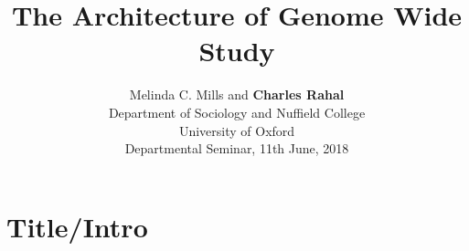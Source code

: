 \documentclass[11pt]{beamer}
\begin{document}
\section{Title/Intro}
\subsection{}
\small
\title{The Architecture of Genome Wide Study\vspace{-.2in}} 
\author{Melinda C. Mills and \textbf{Charles Rahal}\\ Department of Sociology and Nuffield College \\ University of Oxford \\ \vspace{0.1in} Departmental Seminar, 11th June, 2018}
 \date{}
\end{document}
